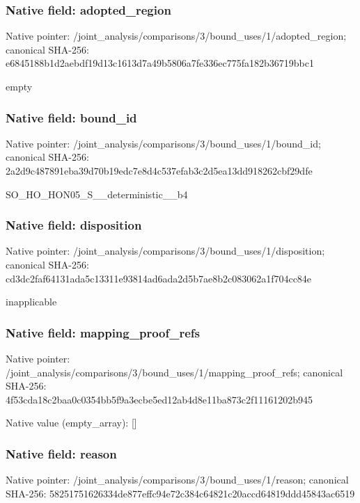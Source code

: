 \documentclass[10pt,a4paper]{article}
\begin{document}
\subsubsection{Native field: adopted\_\allowbreak{}region}
Native pointer: /joint\_\allowbreak{}analysis/comparisons/3/bound\_\allowbreak{}uses/1/adopted\_\allowbreak{}region; canonical SHA-256: e6845188b1d2aebdf19d13c1613d7a49b5806a7fe336ec775fa182b36719bbc1

\begingroup\raggedright\sloppy empty\par\endgroup

\subsubsection{Native field: bound\_\allowbreak{}id}
Native pointer: /joint\_\allowbreak{}analysis/comparisons/3/bound\_\allowbreak{}uses/1/bound\_\allowbreak{}id; canonical SHA-256: 2a2d9c487891eba39d70b19edc7e8d4c537efab3c2d5ea13dd918262cbf29dfe

\begingroup\raggedright\sloppy SO\_\allowbreak{}HO\_\allowbreak{}HON05\_\allowbreak{}S\_\allowbreak{}\_\allowbreak{}deterministic\_\allowbreak{}\_\allowbreak{}b4\par\endgroup

\subsubsection{Native field: disposition}
Native pointer: /joint\_\allowbreak{}analysis/comparisons/3/bound\_\allowbreak{}uses/1/disposition; canonical SHA-256: cd3dc2faf64131ada5c13311e93814ad6ada2d5b7ae8b2c083062a1f704cc84e

\begingroup\raggedright\sloppy inapplicable\par\endgroup

\subsubsection{Native field: mapping\_\allowbreak{}proof\_\allowbreak{}refs}
Native pointer: /joint\_\allowbreak{}analysis/comparisons/3/bound\_\allowbreak{}uses/1/mapping\_\allowbreak{}proof\_\allowbreak{}refs; canonical SHA-256: 4f53cda18c2baa0c0354bb5f9a3ecbe5ed12ab4d8e11ba873c2f11161202b945

Native value (empty\_\allowbreak{}array): []

\subsubsection{Native field: reason}
Native pointer: /joint\_\allowbreak{}analysis/comparisons/3/bound\_\allowbreak{}uses/1/reason; canonical SHA-256: 58251751626334de877effc94e72c384c64821c20accd64819ddd45843ac6519
\end{document}
